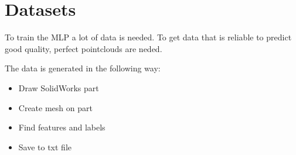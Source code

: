 \section{Datasets}

To train the MLP a lot of data is needed. To get data that is reliable to predict good quality, perfect pointclouds are neded.

The data is generated in the following way:
\begin{itemize}
    \item Draw SolidWorks part
    \item Create mesh on part
    \item Find features and labels
    \item Save to txt file
\end{itemize}